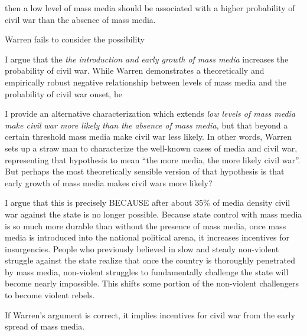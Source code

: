 \documentclass[11pt,article,oneside]{memoir}
\begin{document}
then a low level of mass media should be associated with a higher
probability of civil war than the absence of mass media.

Warren fails to consider the possibility

I argue that the \emph{the introduction and early growth of mass media}
increases the probability of civil war. While Warren demonstrates a
theoretically and empirically robust negative relationship between
levels of mass media and the probability of civil war onset, he

I provide an alternative characterization which extends \emph{low levels
of mass media make civil war more likely than the absence of mass
media,} but that beyond a certain threshold mass media make civil war
less likely. In other words, Warren sets up a straw man to characterize
the well-known cases of media and civil war, representing that
hypothesis to mean ``the more media, the more likely civil war''. But
perhaps the most theoretically sensible version of that hypothesis is
that early growth of mass media makes civil wars more likely?

I argue that this is precisely BECAUSE after about 35\% of media density
civil war against the state is no longer possible. Because state control
with mass media is so much more durable than without the presence of
mass media, once mass media is introduced into the national political
arena, it increases incentives for insurgencies. People who previously
believed in slow and steady non-violent struggle against the state
realize that once the country is thoroughly penetrated by mass media,
non-violent struggles to fundamentally challenge the state will become
nearly impossible. This shifts some portion of the non-violent
challengers to become violent rebels.

If Warren's argument is correct, it implies incentives for civil war
from the early spread of mass media.
\end{document}
